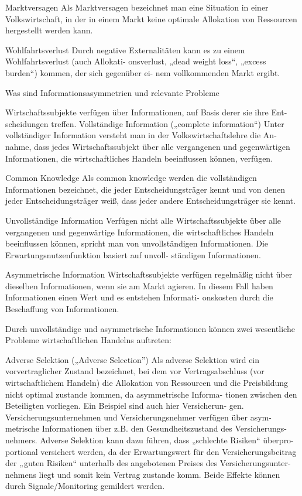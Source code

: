 Marktversagen
Als Marktversagen bezeichnet man eine Situation in einer Volkswirtschaft, in der
in einem Markt keine optimale Allokation von Ressourcen hergestellt werden kann.

Wohlfahrtsverlust
Durch negative Externalitäten kann es zu einem Wohlfahrtsverlust (auch Allokati-
onsverlust, „dead weight loss“, „excess burden“) kommen, der sich gegenüber ei-
nem vollkommenden Markt ergibt.

Was sind Informationsasymmetrien und relevante Probleme

Wirtschaftssubjekte verfügen über Informationen, auf Basis derer sie ihre Ent-
scheidungen treffen.
Vollständige Information („complete information“)
Unter vollständiger Information versteht man in der Volkswirtschaftslehre die An-
nahme, dass jedes Wirtschaftssubjekt über alle vergangenen und gegenwärtigen
Informationen, die wirtschaftliches Handeln beeinflussen können, verfügen.

Common Knowledge
Als common knowledge werden die vollständigen Informationen bezeichnet, die
jeder Entscheidungsträger kennt und von denen jeder Entscheidungsträger weiß,
dass jeder andere Entscheidungsträger sie kennt.

Unvollständige Information
Verfügen nicht alle Wirtschaftssubjekte über alle vergangenen und gegenwärtige
Informationen, die wirtschaftliches Handeln beeinflussen können, spricht man von
unvollständigen Informationen. Die Erwartungsnutzenfunktion basiert auf unvoll-
ständigen Informationen.

Asymmetrische Information
Wirtschaftssubjekte verfügen regelmäßig nicht über dieselben Informationen,
wenn sie am Markt agieren. In diesem Fall haben Informationen einen Wert und es entstehen Informati-
onskosten durch die Beschaffung von Informationen.

Durch unvollständige und asymmetrische Informationen können zwei wesentliche
Probleme wirtschaftlichen Handelns auftreten:

Adverse Selektion („Adverse Selection”)
Als adverse Selektion wird ein vorvertraglicher Zustand bezeichnet, bei dem vor
Vertragsabschluss (vor wirtschaftlichem Handeln) die Allokation von Ressourcen
und die Preisbildung nicht optimal zustande kommen, da asymmetrische Informa-
tionen zwischen den Beteiligten vorliegen. Ein Beispiel sind auch hier Versicherun-
gen. Versicherungsunternehmen und Versicherungsnehmer verfügen über asym-
metrische Informationen über z.B. den Gesundheitszustand des Versicherungs-
nehmers.
Adverse Selektion kann dazu führen, dass „schlechte Risiken“ überpro-
portional versichert werden, da der Erwartungswert für den Versicherungsbeitrag
der „guten Risiken“ unterhalb des angebotenen Preises des Versicherungsunter-
nehmens liegt und somit kein Vertrag zustande komm. 
Beide Effekte können durch Signale/Monitoring gemildert werden. 

